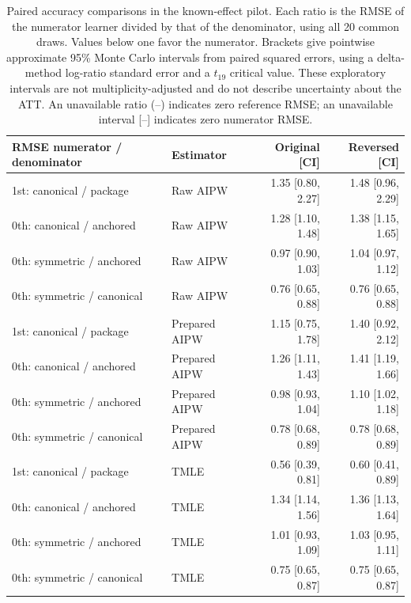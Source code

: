 \begin{table}[p]
\centering
\small
\caption{Paired accuracy comparisons in the known-effect pilot. Each ratio is the RMSE of the numerator learner divided by that of the denominator, using all 20 common draws. Values below one favor the numerator. Brackets give pointwise approximate 95\% Monte Carlo intervals from paired squared errors, using a delta-method log-ratio standard error and a $t_{19}$ critical value. These exploratory intervals are not multiplicity-adjusted and do not describe uncertainty about the ATT. An unavailable ratio (--) indicates zero reference RMSE; an unavailable interval [--] indicates zero numerator RMSE.}
\label{tab:semisynth-comparisons}

\begin{tabular}{llrr}
\toprule
RMSE numerator / denominator & Estimator & Original [CI] & Reversed [CI]\\
\midrule
1st: canonical / package & Raw AIPW & 1.35 [0.80, 2.27] & 1.48 [0.96, 2.29]\\
0th: canonical / anchored & Raw AIPW & 1.28 [1.10, 1.48] & 1.38 [1.15, 1.65]\\
0th: symmetric / anchored & Raw AIPW & 0.97 [0.90, 1.03] & 1.04 [0.97, 1.12]\\
0th: symmetric / canonical & Raw AIPW & 0.76 [0.65, 0.88] & 0.76 [0.65, 0.88]\\
\addlinespace
1st: canonical / package & Prepared AIPW & 1.15 [0.75, 1.78] & 1.40 [0.92, 2.12]\\
0th: canonical / anchored & Prepared AIPW & 1.26 [1.11, 1.43] & 1.41 [1.19, 1.66]\\
0th: symmetric / anchored & Prepared AIPW & 0.98 [0.93, 1.04] & 1.10 [1.02, 1.18]\\
0th: symmetric / canonical & Prepared AIPW & 0.78 [0.68, 0.89] & 0.78 [0.68, 0.89]\\
\addlinespace
1st: canonical / package & TMLE & 0.56 [0.39, 0.81] & 0.60 [0.41, 0.89]\\
0th: canonical / anchored & TMLE & 1.34 [1.14, 1.56] & 1.36 [1.13, 1.64]\\
0th: symmetric / anchored & TMLE & 1.01 [0.93, 1.09] & 1.03 [0.95, 1.11]\\
0th: symmetric / canonical & TMLE & 0.75 [0.65, 0.87] & 0.75 [0.65, 0.87]\\
\bottomrule
\end{tabular}
\end{table}

